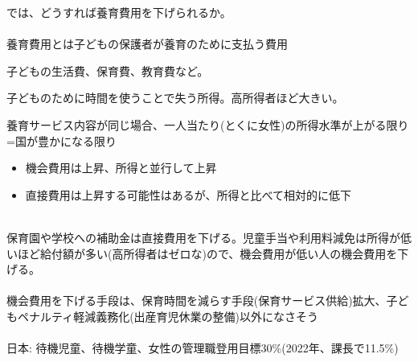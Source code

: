 \begin{frame}[t]{}
では、どうすれば養育費用を下げられるか。\\~\\
\pause
養育費用とは子どもの保護者が養育のために支払う費用
\begin{description}
\vspace{1.0ex}\setlength{\itemsep}{1.0ex}\setlength{\baselineskip}{12pt}
\pause
\item[直接費用]	子どもの生活費、保育費、教育費など。
\pause
\item[機会費用]	子どものために時間を使うことで失う所得。高所得者ほど大きい。
\end{description}

\vspace{2ex}
\pause
養育サービス内容が同じ場合、一人当たり(とくに女性)の所得水準が上がる限り=国が豊かになる限り
\begin{itemize}
\vspace{1.0ex}\setlength{\itemsep}{1.0ex}\setlength{\baselineskip}{12pt}
\pause
\item	機会費用は上昇、所得と並行して上昇
\pause
\item	直接費用は上昇する可能性はあるが、所得と比べて相対的に低下\\~\\
\end{itemize}

\pause
保育園や学校への補助金は直接費用を下げる。児童手当や利用料減免は所得が低いほど給付額が多い(高所得者はゼロな)ので、機会費用が低い人の機会費用を下げる。\\~\\
\pause
機会費用を下げる手段は、保育時間を減らす手段(保育サービス供給)拡大、子どもペナルティ軽減義務化(出産育児休業の整備)以外になさそう\\~\\
\pause
日本: 待機児童、待機学童、女性の管理職登用目標30\%(2022年、課長で11.5\%)
\end{frame}

